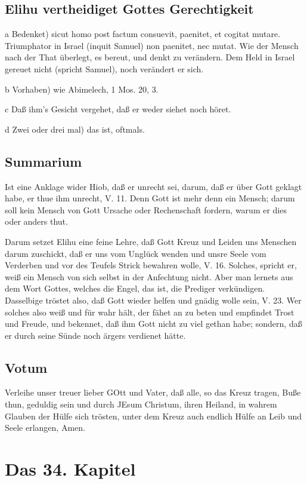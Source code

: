 \section{Elihu vertheidiget Gottes Gerechtigkeit}

a Bedenket) sicut homo post factum consuevit, paenitet, et cogitat mutare. Triumphator in Israel (inquit Samuel) non paenitet, nec mutat. Wie der Mensch nach der That überlegt, es bereut, und denkt zu verändern. Dem Held in Israel gereuet nicht (spricht Samuel), noch verändert er sich.

b Vorhaben) wie Abimelech, 1 Mos. 20, 3.

c Daß ihm's Gesicht vergehet, daß er weder siehet noch höret.

d Zwei oder drei mal) das ist, oftmals.

\section{Summarium}

Ist eine Anklage wider Hiob, daß er unrecht sei, darum, daß er über Gott geklagt habe, er thue ihm unrecht, V. 11. Denn Gott ist mehr denn ein Mensch; darum soll kein Mensch von Gott Ursache oder Rechenschaft fordern, warum er dies oder anders thut.

Darum setzet Elihu eine feine Lehre, daß Gott Kreuz und Leiden uns Menschen darum zuschickt, daß er uns vom Unglück wenden und unsre Seele vom Verderben und vor des Teufels Strick bewahren wolle, V. 16. Solches, spricht er, weiß ein Mensch von sich selbst in der Anfechtung nicht. Aber man lernets aus dem Wort Gottes, welches die Engel, das ist, die Prediger verkündigen. Dasselbige tröstet also, daß Gott wieder helfen und gnädig wolle sein, V. 23. Wer solches also weiß und für wahr hält, der fähet an zu beten und empfindet Trost und Freude, und bekennet, daß ihm Gott nicht zu viel gethan habe; sondern, daß er durch seine Sünde noch ärgers verdienet hätte.

\section{Votum}

Verleihe unser treuer lieber GOtt und Vater, daß alle, so das Kreuz tragen, Buße thun, geduldig sein und durch JEsum Christum, ihren Heiland, in wahrem Glauben der Hülfe sich trösten, unter dem Kreuz auch endlich Hülfe an Leib und Seele erlangen, Amen.

\chapter{Das 34. Kapitel}

